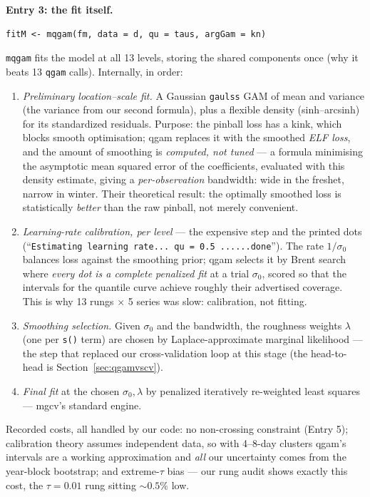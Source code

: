 \documentclass[11pt]{article}
\newcommand{\code}[1]{\texttt{#1}}
\begin{document}
\textbf{Entry 3: the fit itself.}
\begin{Verbatim}[fontsize=\small]
fitM <- mqgam(fm, data = d, qu = taus, argGam = kn)
\end{Verbatim}
\code{mqgam} fits the model at all 13 levels, storing the shared components
once (why it beats 13 \code{qgam} calls). Internally, in order:
\begin{enumerate}
\item \emph{Preliminary location--scale fit.} A Gaussian \code{gaulss} GAM
of mean and variance (the variance from our second formula), plus a
flexible density (sinh--arcsinh) for its standardized residuals. Purpose:
the pinball loss has a kink, which blocks smooth optimisation; qgam
replaces it with the smoothed \emph{ELF loss}, and the amount of smoothing
is \emph{computed, not tuned} --- a formula minimising the asymptotic mean
squared error of the coefficients, evaluated with this density estimate,
giving a \emph{per-observation} bandwidth: wide in the freshet, narrow in
winter. Their theoretical result: the optimally smoothed loss is
statistically \emph{better} than the raw pinball, not merely convenient.
\item \emph{Learning-rate calibration, per level} --- the expensive step
and the printed dots (``\code{Estimating learning rate... qu = 0.5
......done}''). The rate $1/\sigma_0$ balances loss against the smoothing
prior; qgam selects it by Brent search where \emph{every dot is a complete
penalized fit} at a trial $\sigma_0$, scored so that the intervals for the
quantile curve achieve roughly their advertised coverage. This is why 13
rungs $\times$ 5 series was slow: calibration, not fitting.
\item \emph{Smoothing selection.} Given $\sigma_0$ and the bandwidth, the
roughness weights $\lambda$ (one per \code{s()} term) are chosen by
Laplace-approximate marginal likelihood --- the step that replaced our
cross-validation loop at this stage (the head-to-head is
Section~\ref{sec:qgamvscv}).
\item \emph{Final fit} at the chosen $\sigma_0, \lambda$ by penalized
iteratively re-weighted least squares --- mgcv's standard engine.
\end{enumerate}
Recorded costs, all handled by our code: no non-crossing constraint
(Entry 5); calibration theory assumes independent data, so with 4--8-day
clusters qgam's intervals are a working approximation and \emph{all} our
uncertainty comes from the year-block bootstrap; and extreme-$\tau$ bias
--- our rung audit shows exactly this cost, the $\tau = 0.01$ rung sitting
$\sim 0.5\%$ low.
\end{document}
